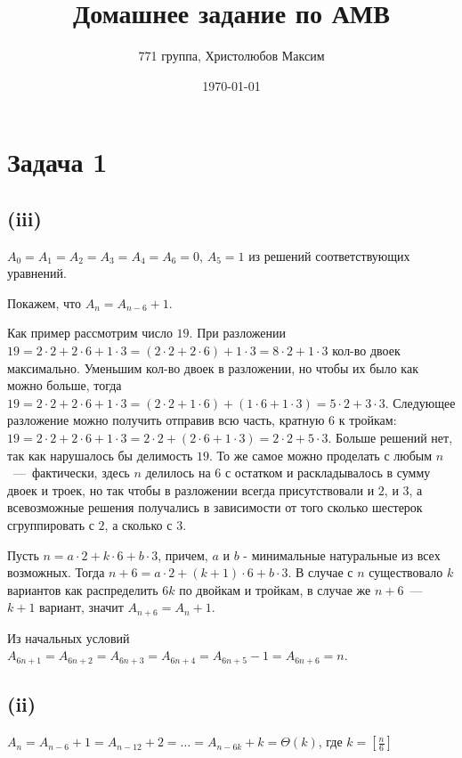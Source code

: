 \documentclass[a4paper,12pt]{article} %
\author{771 группа, Христолюбов Максим}
\title{Домашнее задание по АМВ}
\date{\today}
\begin{document}
	
	\maketitle

\section{Задача 1}
\subsection{(iii)}
\hspace{5mm}
$A_0=A_1=A_2=A_3=A_4=A_6=0$, $A_5=1$ из решений соответствующих уравнений.

Покажем, что $A_n=A_{n-6}+1$.

Как пример рассмотрим число $19$. При разложении $19=2\cdot 2 + 2\cdot 6 + 1\cdot 3=(2\cdot 2 + 2\cdot 6) + 1\cdot 3=8\cdot 2 + 1\cdot 3$ кол-во двоек максимально. Уменьшим кол-во двоек в разложении, но чтобы их было как можно больше, тогда $19=2\cdot 2 + 2\cdot 6 + 1\cdot 3=(2\cdot 2+ 1\cdot 6) + (1\cdot 6 + 1\cdot 3)=5\cdot 2+3\cdot 3$. Следующее разложение можно получить отправив всю часть, кратную $6$ к тройкам: $19=2\cdot 2 + 2\cdot 6 + 1\cdot 3=2\cdot 2+(2\cdot 6 + 1\cdot 3)=2\cdot 2 + 5\cdot 3$. Больше решений нет, так как нарушалось бы делимость $19$. То же самое можно проделать с любым $n$~---~фактически, здесь $n$ делилось на $6$ с остатком и раскладывалось в сумму двоек и троек, но так чтобы в разложении всегда присутствовали и $2$, и $3$, а всевозможные решения получались в зависимости от того сколько шестерок сгруппировать с $2$, а сколько с $3$. 

Пусть $n=a\cdot 2 + k\cdot 6+ b\cdot 3$, причем, $a$ и $b$ - минимальные натуральные из всех возможных. Тогда $n+6=a\cdot 2 + (k+1)\cdot 6+ b\cdot 3$. В случае с $n$ существовало $k$ вариантов как распределить $6k$ по двойкам и тройкам, в случае же $n+6$~---~$k+1$ вариант, значит $A_{n+6}=A_n+1$.

Из начальных условий $A_{6n+1}=A_{6n+2}=A_{6n+3}=A_{6n+4}=A_{6n+5}-1=A_{6n+6}=n$.

\subsection{(ii)}
\hspace{5mm}
$A_n=A_{n-6}+1=A_{n-12}+2=\ldots=A_{n-6k}+k=\Theta(k)$, где $k=[\frac{n}{6}]$
\end{document}
